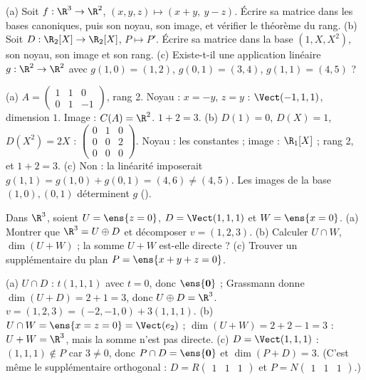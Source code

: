 \begin{exo}
(a) Soit $f:\R^3\to\R^2$, $(x,y,z)\mapsto(x+y,\ y-z)$. Écrire sa matrice dans les bases canoniques, puis son noyau, son image, et vérifier le théorème du rang.
(b) Soit $D:\R_2[X]\to\R_2[X]$, $P\mapsto P'$. Écrire sa matrice dans la base $(1,X,X^2)$, son noyau, son image et son rang.
(c) Existe-t-il une application linéaire $g:\R^2\to\R^2$ avec $g(1,0)=(1,2)$, $g(0,1)=(3,4)$, $g(1,1)=(4,5)$ ?
\begin{corrige}
(a) $A=\begin{pmatrix}1&1&0\\0&1&-1\end{pmatrix}$, rang 2. Noyau : $x=-y$, $z=y$ : $\Vect(-1,1,1)$, dimension $1$. Image : $C(A)=\R^2$. $1+2=3$.
(b) $D(1)=0$, $D(X)=1$, $D(X^2)=2X$ : $\begin{pmatrix}0&1&0\\0&0&2\\0&0&0\end{pmatrix}$. Noyau : les constantes ; image : $\R_1[X]$ ; rang 2, et $1+2=3$.
(c) Non : la linéarité imposerait $g(1,1)=g(1,0)+g(0,1)=(4,6)\neq(4,5)$. Les images de la base $(1,0),(0,1)$ déterminent $g$ ().
\end{corrige}
\end{exo}
\begin{exo}
Dans $\R^3$, soient $U=\ens{z=0}$, $D=\Vect(1,1,1)$ et $W=\ens{x=0}$. (a) Montrer que $\R^3=U\oplus D$ et décomposer $v=(1,2,3)$. (b) Calculer $U\cap W$, $\dim(U+W)$ ; la somme $U+W$ est-elle directe ? (c) Trouver un supplémentaire du plan $P=\ens{x+y+z=0}$.
\begin{corrige}
(a) $U\cap D$ : $t(1,1,1)$ avec $t=0$, donc $\ens{\mathbf 0}$ ; Grassmann donne $\dim(U+D)=2+1=3$, donc $U\oplus D=\R^3$. $v=(1,2,3)=(-2,-1,0)+3(1,1,1)$.
(b) $U\cap W=\ens{x=z=0}=\Vect(e_2)$ ; $\dim(U+W)=2+2-1=3$ : $U+W=\R^3$, mais la somme n'est pas directe.
(c) $D=\Vect(1,1,1)$ : $(1,1,1)\notin P$ car $3\neq0$, donc $P\cap D=\ens{\mathbf 0}$ et $\dim(P+D)=3$. (C'est même le supplémentaire orthogonal : $D=R\begin{pmatrix}1&1&1\end{pmatrix}$ et $P=N\begin{pmatrix}1&1&1\end{pmatrix}$.)
\end{corrige}
\end{exo}

